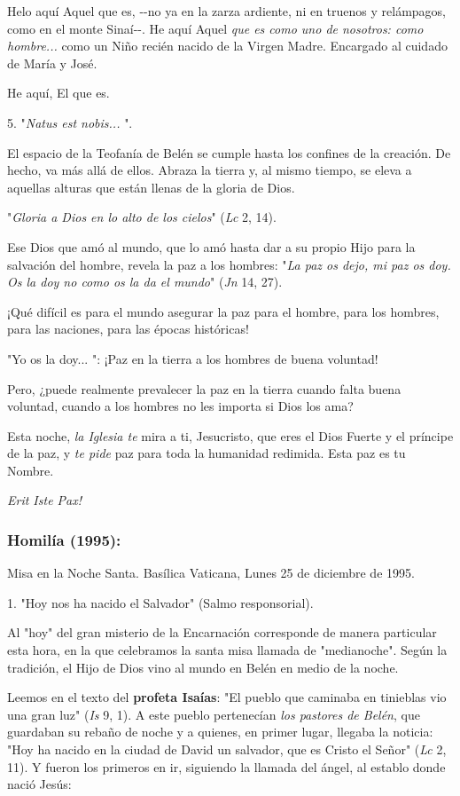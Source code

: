 \begin{body}
\begin{body}
Helo aquí Aquel que es, -\/-no ya en la zarza ardiente, ni en truenos y relámpagos, como en el monte Sinaí-\/-. He aquí Aquel \emph{que es como uno de nosotros: como hombre...} como un Niño recién nacido de la Virgen Madre. Encargado al cuidado de María y José.

He aquí, El que es.

5. "\emph{Natus est nobis...} ".

El espacio de la Teofanía de Belén se cumple hasta los confines de la creación. De hecho, va más allá de ellos. Abraza la tierra y, al mismo tiempo, se eleva a aquellas alturas que están llenas de la gloria de Dios.

"\emph{Gloria a Dios en lo alto de los cielos}" (\emph{Lc} 2, 14).

Ese Dios que amó al mundo, que lo amó hasta dar a su propio Hijo para la salvación del hombre, revela la paz a los hombres: "\emph{La paz os dejo, mi paz os doy. Os la doy no como os la da el mundo}" (\emph{Jn} 14, 27).

¡Qué difícil es para el mundo asegurar la paz para el hombre, para los hombres, para las naciones, para las épocas históricas!

"Yo os la doy... ": ¡Paz en la tierra a los hombres de buena voluntad!

Pero, ¿puede realmente prevalecer la paz en la tierra cuando falta buena voluntad, cuando a los hombres no les importa si Dios los ama?

Esta noche, \emph{la Iglesia te} mira a ti, Jesucristo, que eres el Dios Fuerte y el príncipe de la paz, y \emph{te pide} paz para toda la humanidad redimida. Esta paz es tu Nombre.

\emph{Erit Iste Pax!}
\end{body} 
	
\subsubsection{Homilía (1995): } Misa en la Noche Santa. Basílica Vaticana, Lunes 25 de diciembre de 1995.

\begin{body} 
1. "Hoy nos ha nacido el Salvador" (Salmo responsorial).

Al "hoy" del gran misterio de la Encarnación corresponde de manera particular esta hora, en la que celebramos la santa misa llamada de "medianoche". Según la tradición, el Hijo de Dios vino al mundo en Belén en medio de la noche.

Leemos en el texto del \textbf{profeta Isaías}: "El pueblo que caminaba en tinieblas vio una gran luz" (\emph{Is} 9, 1). A este pueblo pertenecían \emph{los pastores de Belén}, que guardaban su rebaño de noche y a quienes, en primer lugar, llegaba la noticia: "Hoy ha nacido en la ciudad de David un salvador, que es Cristo el Señor" (\emph{Lc} 2, 11). Y fueron los primeros en ir, siguiendo la llamada del ángel, al establo donde nació Jesús:


\end{body}
\end{body}
